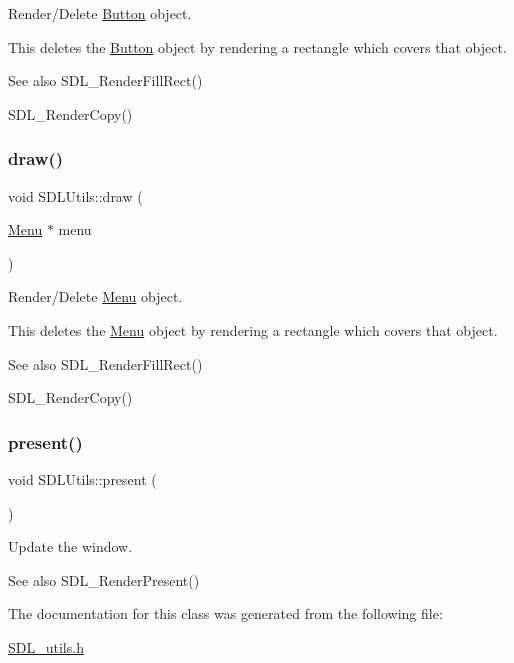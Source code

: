 Render/\+Delete \mbox{\hyperlink{class_button}{Button}} object. 

This deletes the \mbox{\hyperlink{class_button}{Button}} object by rendering a rectangle which covers that object. \begin{DoxySeeAlso}{See also}
S\+D\+L\+\_\+\+Render\+Fill\+Rect() 

S\+D\+L\+\_\+\+Render\+Copy() 
\end{DoxySeeAlso}
\mbox{\label{class_s_d_l_utils_aab6c9aceff31b61a79b4dd7fc13f7473}} 
\subsubsection{\texorpdfstring{draw()}{draw()}\hspace{0.1cm}{\footnotesize\ttfamily [6/6]}}
{\footnotesize\ttfamily void S\+D\+L\+Utils\+::draw (\begin{DoxyParamCaption}\item[{\mbox{\hyperlink{class_menu}{Menu}} $\ast$}]{menu }\end{DoxyParamCaption})\hspace{0.3cm}{\ttfamily [inline]}}



Render/\+Delete \mbox{\hyperlink{class_menu}{Menu}} object. 

This deletes the \mbox{\hyperlink{class_menu}{Menu}} object by rendering a rectangle which covers that object. \begin{DoxySeeAlso}{See also}
S\+D\+L\+\_\+\+Render\+Fill\+Rect() 

S\+D\+L\+\_\+\+Render\+Copy() 
\end{DoxySeeAlso}
\mbox{\label{class_s_d_l_utils_a0e9c4b007ae61772a1c41592877b30ab}} 
\subsubsection{\texorpdfstring{present()}{present()}}
{\footnotesize\ttfamily void S\+D\+L\+Utils\+::present (\begin{DoxyParamCaption}{ }\end{DoxyParamCaption})\hspace{0.3cm}{\ttfamily [inline]}}



Update the window. 

\begin{DoxySeeAlso}{See also}
S\+D\+L\+\_\+\+Render\+Present() 
\end{DoxySeeAlso}


The documentation for this class was generated from the following file\+:\begin{DoxyCompactItemize}
\item 
\mbox{\hyperlink{_s_d_l__utils_8h}{S\+D\+L\+\_\+utils.\+h}}\end{DoxyCompactItemize}
